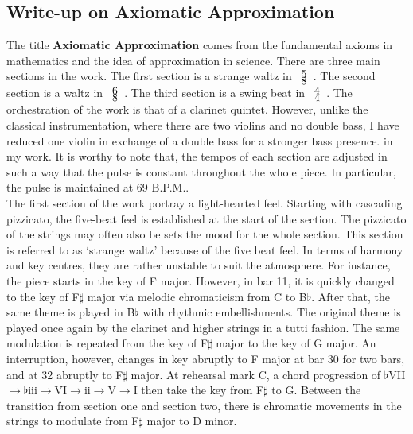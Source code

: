 \documentclass{article}
\begin{document}
\subsection{Write-up on {\bf Axiomatic Approximation}}

The title \textbf{Axiomatic Approximation} comes from the fundamental axioms
in mathematics and the idea of approximation in science. There are three
main sections in the work. The first section is a strange waltz in
\(\def\arraystretch{0.0}\begin{array}{c}5\\8\end{array}\). The second section
    is a waltz in \(\def\arraystretch{0.0}\begin{array}{c}6\\8\end{array}\).
        The third section is a swing beat in
\(\def\arraystretch{0.0}\begin{array}{c}4\\4\end{array}\).  The orchestration
    of the work is that of a clarinet quintet. However, unlike the classical
instrumentation, where there are two violins and no double bass, I have reduced
one violin in exchange of a double bass for a stronger bass presence.
in my work. It is worthy to note that,
the tempos of each section are adjusted in such a way that the pulse is
constant throughout the whole piece. In particular, the pulse is maintained at
69 B.P.M..\\

The first section of the work portray a light-hearted feel. Starting with
cascading pizzicato, the five-beat feel is established at the start of the
section. The pizzicato of the strings may often also be sets the mood for the
whole section. This section is referred to as `strange waltz' because of the
five beat feel.  In terms of harmony and key centres, they are rather unstable
to suit the atmosphere. For instance, the piece starts in the key of F major.
However, in bar 11, it is quickly changed to the key of F\(\sharp\) major via
melodic chromaticism from C to B\(\flat\). After that, the same theme is played
in B\(\flat\) with rhythmic embellishments. The original theme is played once
again by the clarinet and higher strings in a tutti fashion. The same
modulation is repeated from the key of F\(\sharp\) major to the key of G major.
An interruption, however, changes in key abruptly to F major at bar 30 for two
bars, and at 32 abruptly to F\(\sharp\) major.  At rehearsal mark C, a chord
progression of
\(\flat\)VII\(\to\)\(\flat\)iii\(\to\)VI\(\to\)ii\(\to\)V\(\to\)I then take the
key from F\(\sharp\) to G. Between the transition from section one and section
two, there is chromatic movements in the strings to modulate from F\(\sharp\)
major to D minor.\\
\end{document}
